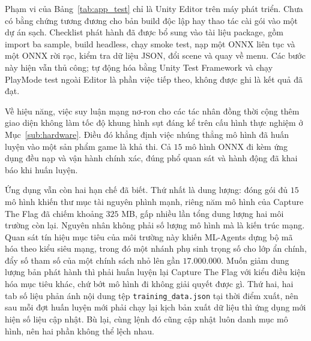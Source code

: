 \indent Phạm vi của Bảng~\ref{tab:app_test} chỉ là Unity Editor trên máy phát triển. Chưa
có bằng chứng tương đương cho bản build độc lập hay thao tác cài gói vào một dự án sạch.
Checklist phát hành đã được bổ sung vào tài liệu package, gồm import ba sample, build
headless, chạy smoke test, nạp một ONNX liên tục và một ONNX rời rạc, kiểm tra dữ liệu JSON,
đổi scene và quay về menu. Các bước này hiện vẫn thủ công; tự động hóa bằng Unity Test
Framework và chạy PlayMode test ngoài Editor là phần việc tiếp theo, không được ghi là kết
quả đã đạt.

\indent Về hiệu năng, việc suy luận mạng nơ-ron cho các tác nhân đồng thời cộng thêm giao
diện không làm tốc độ khung hình sụt đáng kể trên cấu hình thực nghiệm ở
Mục~\ref{sub:hardware}. Điều đó khẳng định việc nhúng thẳng mô hình đã huấn luyện vào một
sản phẩm game là khả thi. Cả $15$ mô hình ONNX đi kèm ứng dụng đều nạp và vận hành
chính xác, đúng phổ quan sát và hành động đã khai báo khi huấn luyện.

\indent Ứng dụng vẫn còn hai hạn chế đã biết. Thứ nhất là dung lượng: đóng gói đủ $15$ mô hình
khiến thư mục tài nguyên phình mạnh, riêng năm mô hình của Capture The Flag đã
chiếm khoảng $325$ MB, gấp nhiều lần tổng dung lượng hai môi trường còn lại. Nguyên nhân không
phải số lượng mô hình mà là kiến trúc mạng. Quan sát tín hiệu mục tiêu của môi trường này
khiến ML-Agents dựng bộ mã hóa theo kiểu siêu mạng, trong đó một
nhánh phụ sinh trọng số cho lớp ẩn chính, đẩy số tham số của một chính sách nhỏ lên gần
$17.000.000$. Muốn giảm dung lượng bản phát hành thì phải huấn luyện lại Capture The
Flag với kiểu điều kiện hóa mục tiêu khác, chứ bớt mô hình đi không giải quyết được gì.
Thứ hai, hai tab số liệu phản ánh nội dung tệp \texttt{training\_data.json} tại thời điểm
xuất, nên sau mỗi đợt huấn luyện mới phải chạy lại kịch bản xuất dữ liệu thì ứng dụng mới
hiện số liệu cập nhật. Bù lại, cùng lệnh đó cũng cập nhật luôn danh mục mô hình, nên hai
phần không thể lệch nhau.
